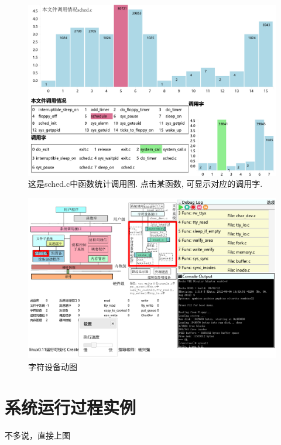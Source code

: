 \documentclass[]{report}
\begin{document}
\begin{figure}[htbp]
    \centering
    \includegraphics[width=\textwidth,natwidth=590 ,natheight=406]{img/eachFileCall.pdf}
    \caption[]{这是sched.c中函数统计调用图. 点击某函数, 可显示对应的调用字.}
    \label{fig:eachFileCallgraph}
\end{figure}

\begin{figure}[htbp]
    \centering
    \includegraphics[width=\textwidth,natwidth=756 ,natheight=450]{img/chrdrv.pdf}
    \caption[]{字符设备动图}
    \label{fig:ChrDrvgraph}
\end{figure}

\chapter{系统运行过程实例}

不多说，直接上图
\end{document}
